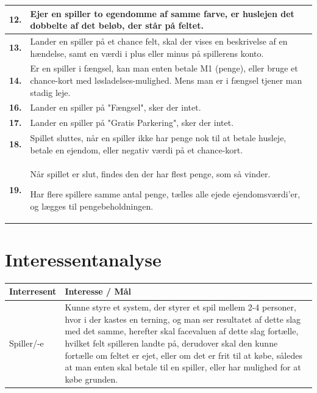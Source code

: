 \begin{tabular}{| l |p{13cm}|}
    \hline
    \textbf{12.}
    &
    Ejer en spiller to egendomme af samme farve, er huslejen det dobbelte af det beløb, der står på feltet. \\
      
    \hline
    \textbf{13.}
    &
    Lander en spiller på et chance felt, skal der vises en beskrivelse af en hændelse, samt en værdi i plus eller minus på spillerens konto. \\
      
    \hline
    \textbf{14.}
    &
    Er en spiller i fængsel, kan man enten betale M1 (penge), eller bruge et chance-kort med løsladelses-mulighed. Mens man er i fængsel tjener man stadig leje. \\
      
    \hline
    \textbf{16.}
    &
    Lander en spiller på "Fængsel", sker der intet. \\
      
    \hline
    \textbf{17.}
    &
    Lander en spiller på "Gratis Parkering", sker der intet. \\
      
    \hline
    \textbf{18.}
    &
    Spillet sluttes, når en spiller ikke har penge nok til at betale husleje, betale en ejendom, eller negativ værdi på et chance-kort. \\
      
    \hline
    \textbf{19.}
    &
    Når spillet er slut, findes den der har flest penge, som så vinder. 
    
    Har flere spillere samme antal penge, tælles alle ejede ejendomsværdi’er, og lægges til pengebeholdningen. \\
      
    \hline
\end{tabular}

\pagebreak

\section{Interessentanalyse}

    \begin{tabular}{ | l | p{13cm} |}
      
      \hline
    \textbf{Interresent} & \textbf{Interesse / Mål} \\ \hline
    Spiller/-e & Kunne styre et system, der styrer et spil mellem 2-4 personer, 
    hvor i der kastes en terning, og man ser resultatet af dette slag med det samme, herefter skal facevaluen af dette slag fortælle, hvilket felt spilleren landte på, derudover skal den kunne fortælle om feltet er ejet, eller om det er frit til at købe, således at man enten skal betale til en spiller, eller har mulighed for at købe grunden.\\ \hline
      
    \hline
    \end{tabular}


